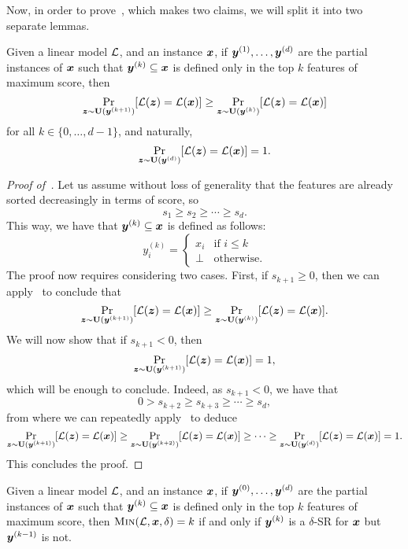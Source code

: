 Now, in order to prove~, which makes two claims, we will split it into two separate lemmas. 
\begin{claim}\label{lemma:greedy-1}
    Given a linear model $\mathcal{L}$, and an instance ${\bm{x}}$, if ${\bm{y}}^{(1)}, \ldots, {\bm{y}}^{(d)}$ are the partial instances of ${\bm{x}}$ such that ${\bm{y}}^{(k)} \subseteq {\bm{x}}$ is defined only in the top $k$ features of maximum score, then
    \[ 
        \Pr_{{\bm{z}} \sim \mathbf{U}({\bm{y}}^{(k+1)})}[\mathcal{L}({\bm{z}}) = \mathcal{L}({\bm{x}})] \geq \Pr_{{\bm{z}} \sim \mathbf{U}({\bm{y}}^{(k)})}[\mathcal{L}({\bm{z}}) = \mathcal{L}({\bm{x}})]
    \]
    for all $k \in \{0, \ldots, d-1\}$, and naturally, 
    \[ 
    \Pr_{{\bm{z}} \sim \mathbf{U}({\bm{y}}^{(d)})}[\mathcal{L}({\bm{z}}) = \mathcal{L}({\bm{x}})] = 1.
    \]
\end{claim}
\begin{proof}[Proof of~]
Let us assume without loss of generality that the features are already sorted decreasingly in terms of score, so \[s_1 \geq s_2 \geq \cdots \geq s_d.\]
This way, we have that ${\bm{y}}^{(k)} \subseteq {\bm{x}}$ is defined as follows:
\[ 
    y^{(k)}_i = \begin{cases}
        x_i & \text{if } i \leq k\\
        \bot & \text{otherwise}.
    \end{cases}
\]
The proof now requires considering two cases. First, if $s_{k+1} \geq 0$, then we can apply~ to conclude that
\[ 
    \Pr_{{\bm{z}} \sim \mathbf{U}({\bm{y}}^{(k+1)})}[\mathcal{L}({\bm{z}}) = \mathcal{L}({\bm{x}})] \geq \Pr_{{\bm{z}} \sim \mathbf{U}({\bm{y}}^{(k)})}[\mathcal{L}({\bm{z}}) = \mathcal{L}({\bm{x}})].
\]
We will now show that if $s_{k+1} < 0$, then 
\[ 
    \Pr_{{\bm{z}} \sim \mathbf{U}({\bm{y}}^{(k+1)})}[\mathcal{L}({\bm{z}}) = \mathcal{L}({\bm{x}})] = 1,
\]
which will be enough to conclude. Indeed, as $s_{k+1} < 0$, we have that 
\[
   0 > s_{k+2} \geq s_{k+3} \geq \cdots \geq s_d, 
\]
from where we can repeatedly apply~ to deduce 
\[ 
    \Pr_{{\bm{z}} \sim \mathbf{U}({\bm{y}}^{(k+1)})}[\mathcal{L}({\bm{z}}) = \mathcal{L}({\bm{x}})]  \geq \Pr_{{\bm{z}} \sim \mathbf{U}({\bm{y}}^{(k+2)})}[\mathcal{L}({\bm{z}}) = \mathcal{L}({\bm{x}})] \geq \cdots \geq \Pr_{{\bm{z}} \sim \mathbf{U}({\bm{y}}^{(d)})}[\mathcal{L}({\bm{z}}) = \mathcal{L}({\bm{x}})] = 1.
\]
This concludes the proof.
\end{proof}
\begin{lemma}\label{lemma:greedy-2}
    Given a linear model $\mathcal{L}$, and an instance ${\bm{x}}$, if ${\bm{y}}^{(0)}, \ldots, {\bm{y}}^{(d)}$ are the partial instances of ${\bm{x}}$ such that ${\bm{y}}^{(k)} \subseteq {\bm{x}}$ is defined only in the top $k$ features of maximum score, then $\operatorname{\textsc{Min}}(\mathcal{L}, {\bm{x}}, \delta) = k$ if and only if ${\bm{y}}^{(k)}$ is a $\delta$-SR for ${\bm{x}}$ but ${\bm{y}}^{(k-1)}$ is not. 
\end{lemma}

